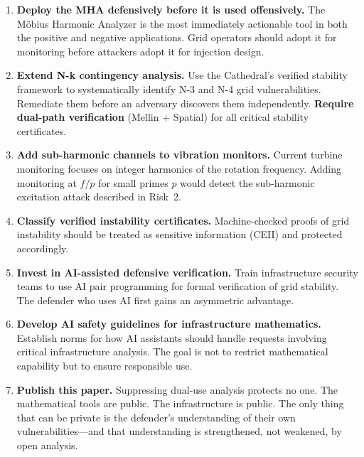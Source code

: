 \documentclass[11pt,a4paper]{article}
\begin{document}
\begin{enumerate}
  \item \textbf{Deploy the MHA defensively before it is used
    offensively.} The M\"obius Harmonic Analyzer is the most
    immediately actionable tool in both the positive and negative
    applications. Grid operators should adopt it for monitoring
    before attackers adopt it for injection design.

  \item \textbf{Extend N-k contingency analysis.} Use the Cathedral's
    verified stability framework to systematically identify N-3 and
    N-4 grid vulnerabilities. Remediate them before an adversary
    discovers them independently. \textbf{Require dual-path
    verification} (Mellin + Spatial) for all critical stability
    certificates.

  \item \textbf{Add sub-harmonic channels to vibration monitors.}
    Current turbine monitoring focuses on integer harmonics of the
    rotation frequency. Adding monitoring at $f/p$ for small primes
    $p$ would detect the sub-harmonic excitation attack described
    in Risk~2.

  \item \textbf{Classify verified instability certificates.}
    Machine-checked proofs of grid instability should be treated
    as sensitive information (CEII) and protected accordingly.

  \item \textbf{Invest in AI-assisted defensive verification.}
    Train infrastructure security teams to use AI pair programming
    for formal verification of grid stability. The defender who
    uses AI first gains an asymmetric advantage.

  \item \textbf{Develop AI safety guidelines for infrastructure
    mathematics.} Establish norms for how AI assistants should
    handle requests involving critical infrastructure analysis.
    The goal is not to restrict mathematical capability but to
    ensure responsible use.

  \item \textbf{Publish this paper.} Suppressing dual-use analysis
    protects no one. The mathematical tools are public. The
    infrastructure is public. The only thing that can be private is
    the defender's understanding of their own vulnerabilities---and
    that understanding is strengthened, not weakened, by open
    analysis.
\end{enumerate}
\end{document}
